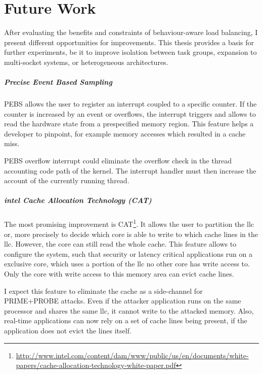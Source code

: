 \chapter{Future Work}
\label{sec:futurework}


After evaluating the benefits and constraints of behaviour-aware load
balancing, I present different opportunities for improvements.
This thesis provides a basis for further experiments, be it to improve
isolation between task groups, expansion to multi-socket systems, or
heterogeneous architectures.

\paragraph{Precise Event Based Sampling}
PEBS allows the user to register an interrupt coupled to a specific counter.
If the counter is increased by an event or overflows, the interrupt triggers
and allows to read the hardware state from a prespecified memory region.
This feature helps a developer to pinpoint, for example memory accesses which
resulted in a cache miss.

PEBS overflow interrupt could eliminate the overflow check in the thread
accounting code path of the kernel.
The interrupt handler must then increase the account of the currently running
thread.

\paragraph{\gls{intel} Cache Allocation Technology (CAT)}
The most promising improvement is CAT\footnote{
  \url{http://www.intel.com/content/dam/www/public/us/en/documents/white-papers/cache-allocation-technology-white-paper.pdf}}.
It allows the user to partition the \gls{llc} or, more precisely to decide
which core is able to write to which cache lines in the \gls{llc}.
However, the core can still read the whole cache.
This feature allows to configure the system, such that security or latency
critical applications run on a exclusive core, which uses a portion of the
\gls{llc} no other core has write access to.
Only the core with write access to this memory area can evict cache lines.

I expect this feature to eliminate the cache as a side-channel for PRIME+PROBE
attacks.
Even if the attacker application runs on the same processor and shares the same
\gls{llc}, it cannot write to the attacked memory.
Also, real-time applications can now rely on a set of cache lines being
present, if the application does not evict the lines itself.

